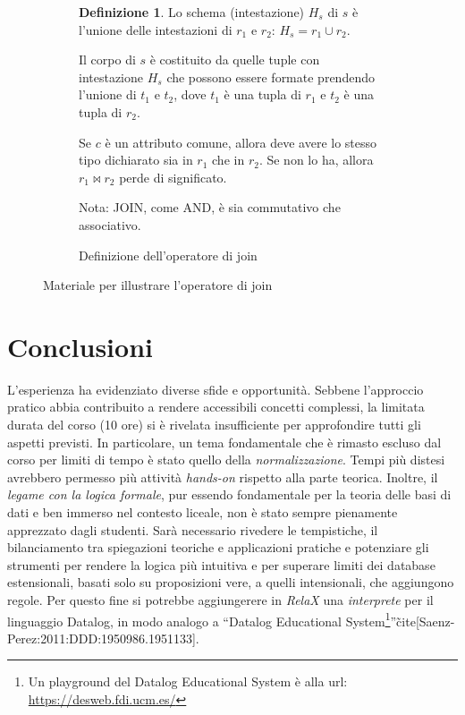 \documentclass[withtimes]{easychair}
\theoremstyle{definition}
\newtheorem{definition}{Definizione}
\begin{document}
\begin{figure}[htp]
\begin{subfigure}[t]{\textwidth}
\begin{definition}
Lo schema (intestazione) $H_s$ di $s$ è l'unione delle intestazioni di $r_1$ e $r_2$: $H_s = r_1 \cup r_2$.

Il corpo di $s$ è costituito da quelle tuple con intestazione $H_s$ che possono essere formate prendendo l'unione di $t_1$ e $t_2$, dove $t_1$ è una tupla di $r_1$ e $t_2$ è una tupla di $r_2$.

Se $c$ è un attributo comune, allora deve avere lo stesso tipo dichiarato sia in $r_1$ che in $r_2$. Se non lo ha, allora $r_1 \bowtie r_2$ perde di significato.

Nota: JOIN, come AND, è sia commutativo che associativo.
		\end{definition}
		\caption{Definizione dell'operatore di join\label{fig:join-def}}
	\end{subfigure}

      \caption{Materiale per illustrare l'operatore di join}\label{fig:table-join}
\end{figure}

\section{Conclusioni}\label{conclusioni}

L'esperienza ha evidenziato diverse sfide e opportunità. Sebbene l'approccio pratico abbia contribuito a rendere accessibili concetti complessi, la limitata durata del corso (10 ore) si è rivelata insufficiente per approfondire tutti gli aspetti previsti. In particolare, un tema fondamentale che è rimasto escluso dal corso per limiti di tempo è stato quello della \emph{normalizzazione}. Tempi più distesi avrebbero permesso più attività \emph{hands-on} rispetto alla parte teorica. Inoltre, il \emph{legame con la logica formale}, pur essendo fondamentale per la teoria delle basi di dati e ben immerso nel contesto liceale, non è stato sempre pienamente apprezzato dagli studenti. Sarà necessario rivedere le tempistiche, il bilanciamento tra spiegazioni teoriche e applicazioni pratiche e potenziare gli strumenti per rendere la logica più intuitiva e per superare  limiti dei database estensionali, basati solo su proposizioni vere, a quelli intensionali, che aggiungono regole. Per questo fine si potrebbe aggiungerere in \emph{RelaX} una \emph{interprete} per il linguaggio Datalog, in modo analogo a ``Datalog Educational System\footnote{Un playground del Datalog Educational System è alla url: \url{https://desweb.fdi.ucm.es/}}''\~cite[Saenz-Perez:2011:DDD:1950986.1951133].

\label{sect:bib}
\printbibliography
\end{document}
